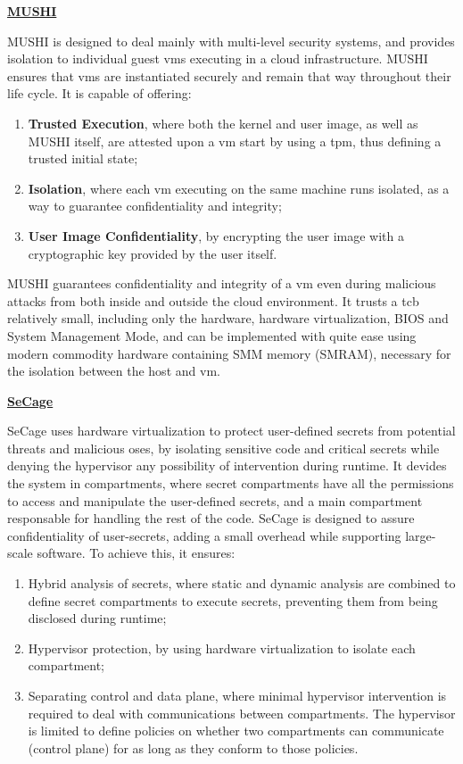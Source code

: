 
\underline{\textbf{MUSHI}}

MUSHI \cite{mushiPaper} is designed to deal mainly with multi-level security systems, and provides isolation to individual guest \gls{vm}s executing in a cloud infrastructure. MUSHI ensures that \gls{vm}s are instantiated securely and remain that way throughout their life cycle. 
It is capable of offering: 
\begin{enumerate}
	\item \textbf{Trusted Execution}, where both the kernel and user image, as well as MUSHI itself, are attested upon a \gls{vm} start by using a \gls{tpm}, thus defining a trusted initial state;
	\item \textbf{Isolation}, where each \gls{vm} executing on the same machine runs isolated, as a way to guarantee confidentiality and integrity;
	\item \textbf{User Image Confidentiality}, by encrypting the user image with a cryptographic key provided by the user itself.
\end{enumerate}
MUSHI guarantees confidentiality and integrity of a \gls{vm} even during malicious attacks from both inside and outside the cloud environment.
It trusts a \gls{tcb} relatively small, including only the hardware, hardware virtualization, BIOS and System Management Mode, and can be implemented with quite ease using modern commodity hardware containing SMM memory (SMRAM), necessary for the isolation between the host and \gls{vm}.\newline


\underline{\textbf{SeCage}}

SeCage \cite{SeCagePaper} uses hardware virtualization to protect user-defined secrets from potential threats and malicious \gls{os}es, by isolating sensitive code and critical secrets while denying the hypervisor any possibility of intervention during runtime.
It devides the system in compartments, where secret compartments have all the permissions to access and manipulate the user-defined secrets, and a main compartment responsable for handling the rest of the code.
SeCage is designed to assure confidentiality of user-secrets, adding a small overhead while supporting large-scale software. To achieve this, it ensures:
\begin{enumerate}
	\item Hybrid analysis of secrets, where static and dynamic analysis are combined to define secret compartments to execute secrets, preventing them from being disclosed during runtime;
	\item Hypervisor protection, by using hardware virtualization to isolate each compartment;
	\item Separating control and data plane, where minimal hypervisor intervention is required to deal with communications between compartments. The hypervisor is limited to define policies on whether two compartments can communicate (control plane) for as long as they conform to those policies.
\end{enumerate}


